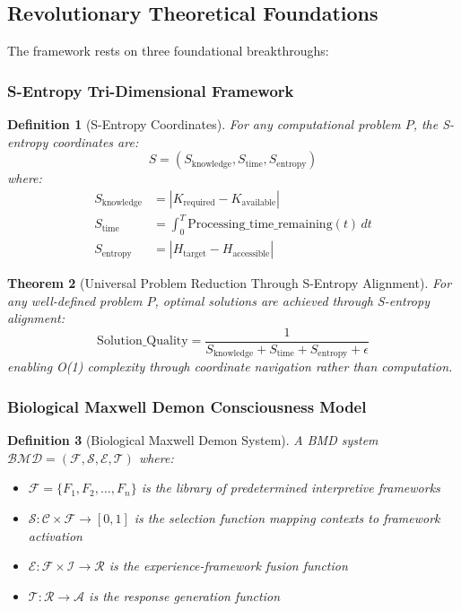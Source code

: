 \documentclass[12pt,a4paper]{article}
\newtheorem{theorem}{Theorem}[section]
\newtheorem{definition}[theorem]{Definition}
\begin{document}
\subsection{Revolutionary Theoretical Foundations}

The framework rests on three foundational breakthroughs:

\subsubsection{S-Entropy Tri-Dimensional Framework}

\begin{definition}[S-Entropy Coordinates]
For any computational problem $P$, the S-entropy coordinates are:
\begin{equation}
S = (S_{\text{knowledge}}, S_{\text{time}}, S_{\text{entropy}})
\end{equation}
where:
\begin{align}
S_{\text{knowledge}} &= |K_{\text{required}} - K_{\text{available}}| \\
S_{\text{time}} &= \int_0^T \text{Processing\_time\_remaining}(t) \, dt \\
S_{\text{entropy}} &= |H_{\text{target}} - H_{\text{accessible}}|
\end{align}
\end{definition}

\begin{theorem}[Universal Problem Reduction Through S-Entropy Alignment]
For any well-defined problem $P$, optimal solutions are achieved through S-entropy alignment:
\begin{equation}
\text{Solution\_Quality} = \frac{1}{S_{\text{knowledge}} + S_{\text{time}} + S_{\text{entropy}} + \epsilon}
\end{equation}
enabling O(1) complexity through coordinate navigation rather than computation.
\end{theorem}

\subsubsection{Biological Maxwell Demon Consciousness Model}

\begin{definition}[Biological Maxwell Demon System]
A BMD system $\mathcal{BMD} = (\mathcal{F}, \mathcal{S}, \mathcal{E}, \mathcal{T})$ where:
\begin{itemize}
\item $\mathcal{F} = \{F_1, F_2, \ldots, F_n\}$ is the library of predetermined interpretive frameworks
\item $\mathcal{S}: \mathcal{C} \times \mathcal{F} \rightarrow [0,1]$ is the selection function mapping contexts to framework activation
\item $\mathcal{E}: \mathcal{F} \times \mathcal{I} \rightarrow \mathcal{R}$ is the experience-framework fusion function
\item $\mathcal{T}: \mathcal{R} \rightarrow \mathcal{A}$ is the response generation function
\end{itemize}
\end{definition}
\end{document}
